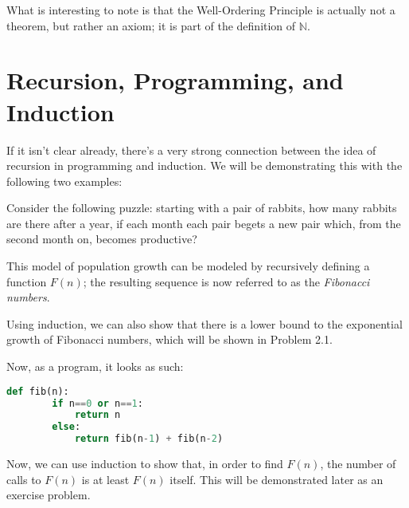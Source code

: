 \documentclass[openany]{book}
\newcommand{\NN}{\mathbb{N}}
\begin{document}
\begin{rmk}
	What is interesting to note is that the Well-Ordering Principle is actually not a theorem, but rather an axiom; it is part of the definition of $\NN$.
\end{rmk}

\section{Recursion, Programming, and Induction}

If it isn't clear already, there's a very strong connection between the idea of recursion in programming and induction.  We will be demonstrating this with the following two examples:
\begin{example}
	Consider the following puzzle: starting with a pair of rabbits, how many rabbits are there after a year, if each month each pair begets a new pair which, from the second month on, becomes productive?
	
	This model of population growth can be modeled by recursively defining a function $F(n)$; the resulting sequence is now referred to as the \textit{Fibonacci numbers}.

	Using induction, we can also show that there is a lower bound to the exponential growth of Fibonacci numbers, which will be shown in Problem 2.1.

	Now, as a program, it looks as such:
	\begin{lstlisting}[language=Python]
	def fib(n):
		if n==0 or n==1:
			return n
		else:
			return fib(n-1) + fib(n-2)
	\end{lstlisting}
	Now, we can use induction to show that, in order to find $F(n)$, the number of calls to $F(n)$ is at least $F(n)$ itself. This will be demonstrated later as an exercise problem.
\end{example}
\end{document}
